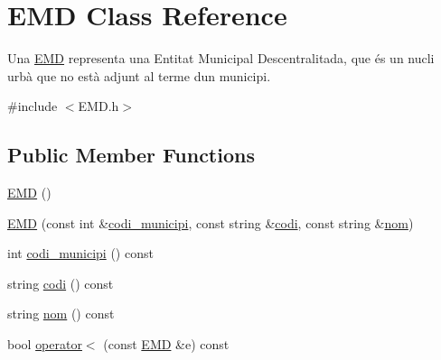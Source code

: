 \hypertarget{classEMD}{}\section{E\+MD Class Reference}
\label{classEMD}


Una \hyperlink{classEMD}{E\+MD} representa una Entitat Municipal Descentralitada, que és un nucli urbà que no està adjunt al terme d\textquotesingle{}un municipi.  




{\ttfamily \#include $<$E\+M\+D.\+h$>$}

\subsection*{Public Member Functions}
\begin{DoxyCompactItemize}
\item 
\hyperlink{classEMD_a1b23820b6cb96bf647c2d61ad2651225}{E\+MD} ()
\item 
\hyperlink{classEMD_ab77285f553e7476e81c119a229a472a6}{E\+MD} (const int \&\hyperlink{classEMD_afa3f267ffd6407f481e48fc5cfd4d577}{codi\+\_\+municipi}, const string \&\hyperlink{classEMD_ae34a435b49ffbc76b550dbeb6260e183}{codi}, const string \&\hyperlink{classEMD_a170411430493c144bb7eb00d7def4a51}{nom})
\item 
int \hyperlink{classEMD_afa3f267ffd6407f481e48fc5cfd4d577}{codi\+\_\+municipi} () const
\item 
string \hyperlink{classEMD_ae34a435b49ffbc76b550dbeb6260e183}{codi} () const
\item 
string \hyperlink{classEMD_a170411430493c144bb7eb00d7def4a51}{nom} () const
\item 
bool \hyperlink{classEMD_a73e84ad03c35f6374ce50320e4135d0c}{operator$<$} (const \hyperlink{classEMD}{E\+MD} \&e) const
\end{DoxyCompactItemize}
